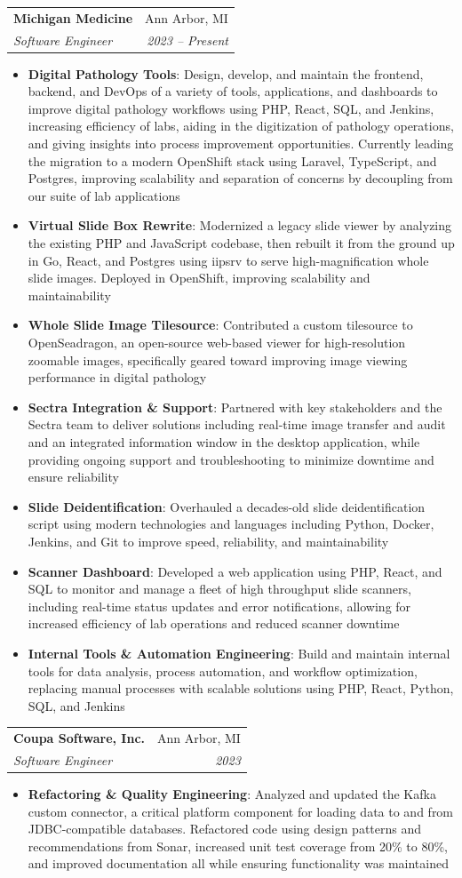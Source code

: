 \documentclass[letterpaper,10pt]{article}
\makeatletter
\newcommand{\resumeItem}[2]{
  \item\small{
    \textbf{#1}{: #2 \vspace{-2pt}}
  }
}
\newcommand{\resumeSubheading}[4]{
  \vspace{-1pt}\item
    \begin{tabular*}{0.97\textwidth}[t]{l@{\extracolsep{\fill}}r}
      \textbf{#1} & #2 \\
      \textit{\small#3} & \textit{\small #4} \\
    \end{tabular*}\vspace{-5pt}
}
\newcommand{\resumeItemListStart}{\begin{itemize}}
\newcommand{\resumeItemListEnd}{\end{itemize}\vspace{-5pt}}
\makeatother
\begin{document}
    \resumeSubheading
      {Michigan Medicine}{Ann Arbor, MI}
      {Software Engineer}{2023 -- Present}
      \resumeItemListStart
        \resumeItem{Digital Pathology Tools}
          {Design, develop, and maintain the frontend, backend, and DevOps of a variety of tools, applications, and dashboards to improve digital pathology workflows using PHP, React, SQL, and Jenkins, increasing efficiency of labs, aiding in the digitization of pathology operations, and giving insights into process improvement opportunities. Currently leading the migration to a modern OpenShift stack using Laravel, TypeScript, and Postgres, improving scalability and separation of concerns by decoupling from our suite of lab applications}
        \resumeItem{Virtual Slide Box Rewrite}
          {Modernized a legacy slide viewer by analyzing the existing PHP and JavaScript codebase, then rebuilt it from the ground up in Go, React, and Postgres using iipsrv to serve high-magnification whole slide images. Deployed in OpenShift, improving scalability and maintainability}
        \resumeItem{Whole Slide Image Tilesource}
          {Contributed a custom tilesource to OpenSeadragon, an open-source web-based viewer for high-resolution zoomable images, specifically geared toward improving image viewing performance in digital pathology}
        \resumeItem{Sectra Integration \& Support}
          {Partnered with key stakeholders and the Sectra team to deliver solutions including real-time image transfer and audit and an integrated information window in the desktop application, while providing ongoing support and troubleshooting to minimize downtime and ensure reliability}
        \resumeItem{Slide Deidentification}
          {Overhauled a decades-old slide deidentification script using modern technologies and languages including Python, Docker, Jenkins, and Git to improve speed, reliability, and maintainability}
        \resumeItem{Scanner Dashboard}
          {Developed a web application using PHP, React, and SQL to monitor and manage a fleet of high throughput slide scanners, including real-time status updates and error notifications, allowing for increased efficiency of lab operations and reduced scanner downtime}
        \resumeItem{Internal Tools \& Automation Engineering}
          {Build and maintain internal tools for data analysis, process automation, and workflow optimization, replacing manual processes with scalable solutions using PHP, React, Python, SQL, and Jenkins}
      \resumeItemListEnd

    \resumeSubheading
      {Coupa Software, Inc.}{Ann Arbor, MI}
      {Software Engineer}{2023}
      \resumeItemListStart
        \resumeItem{Refactoring \& Quality Engineering}
          {Analyzed and updated the Kafka custom connector, a critical platform component for loading data to and from JDBC-compatible databases. Refactored code using design patterns and recommendations from Sonar, increased unit test coverage from 20\% to 80\%, and improved documentation all while ensuring functionality was maintained}
      \resumeItemListEnd
    
\end{document}
